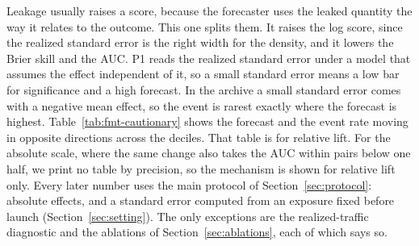 \begin{table}[t]\centering\scriptsize
\caption{What each choice of the cautionary run does on its own, with P1 on the headline archive and the same rows. The AUC is computed for the significant-positive event, pooled and within pairs of origin and cell. The last column states where the AUC interval sits wholly below one half.}
\label{tab:fmt-leak-choices}

\end{table}

Leakage usually raises a score, because the forecaster uses the leaked quantity the way it relates to the outcome. This one splits them. It raises the log score, since the realized standard error is the right width for the density, and it lowers the Brier skill and the AUC. P1 reads the realized standard error under a model that assumes the effect independent of it, so a small standard error means a low bar for significance and a high forecast. In the archive a small standard error comes with a negative mean effect, so the event is rarest exactly where the forecast is highest. Table~\ref{tab:fmt-cautionary} shows the forecast and the event rate moving in opposite directions across the deciles. That table is for relative lift. For the absolute scale, where the same change also takes the AUC within pairs below one half, we print no table by precision, so the mechanism is shown for relative lift only. Every later number uses the main protocol of Section~\ref{sec:protocol}: absolute effects, and a standard error computed from an exposure fixed before launch (Section~\ref{sec:setting}). The only exceptions are the realized-traffic diagnostic and the ablations of Section~\ref{sec:ablations}, each of which says so.

